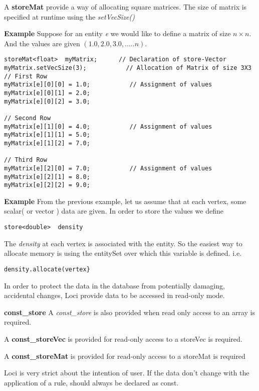\par A {\bf storeMat} provide a way of allocating square matrices. The 
size of matrix is specified at runtime using the {\em setVecSize()}
\par {\bf Example} Suppose for an entity {\em e} we would like to define a matrix
of size ${n \times n}$. And the values are given $(1.0,2.0,3.0,.....n)$. 
%
\begin{verbatim}
storeMat<float>  myMatrix;      // Declaration of store-Vector
myMatrix.setVecSize(3);           // Allocation of Matrix of size 3X3
// First Row
myMatrix[e][0][0] = 1.0;           // Assignment of values 
myMatrix[e][0][1] = 2.0;
myMatrix[e][0][2] = 3.0;

// Second Row
myMatrix[e][1][0] = 4.0;           // Assignment of values 
myMatrix[e][1][1] = 5.0;
myMatrix[e][1][2] = 7.0;

// Third Row
myMatrix[e][2][0] = 7.0;           // Assignment of values 
myMatrix[e][2][1] = 8.0;
myMatrix[e][2][2] = 9.0;
\end{verbatim}

\par {\bf Example} From the previous example, let us assume that at 
each vertex, some scalar( or vector ) data are given. In order to store
the values we define
\begin{verbatim}
store<double>  density
\end{verbatim}
The {\em density } at each vertex is associated with the entity. So
the easiest way to allocate memory is using the entitySet over which this
variable is defined. i.e.
\begin{verbatim}
density.allocate(vertex}
\end{verbatim}

\par In order to protect the data in the database from potentially damaging,
accidental changes, Loci provide data to be accessed in read-only mode. 
%  
\par {\bf const\_store }A {\em const\_store} is also provided when
read only access to an array is required.
%  
\par A {\bf const\_storeVec} is  provided for read-only access to a storeVec is required.
\par A {\bf const\_storeMat} is provided for read-only access to a storeMat is required

\par Loci is very strict about the intention of user. If the data don't change with
the application of a rule, should always be declared as const. 

